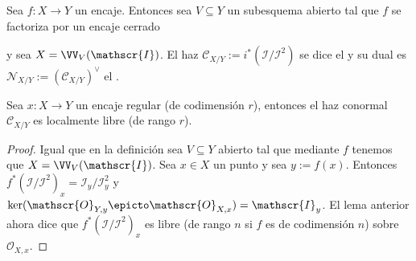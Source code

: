 \begin{mydef}

	Sea $f \colon X \to Y$ un encaje.
	Entonces sea $V \subseteq Y$ un subesquema abierto tal que $f$ se factoriza por un encaje cerrado 
	y sea $X = \VV_V(\mathscr{I})$.
	El haz $\mathscr{C}_{X/Y} := i^*(\mathscr{I/I}^2)$ se dice el  y su dual
	es $\mathscr{N}_{X/Y} := (\mathscr{C}_{X/Y})^\vee$ el .
\end{mydef}
\begin{cor}\label{thm:conormal_rank}
	Sea $x \colon X \to Y$ un encaje regular (de codimensión $r$), entonces el haz conormal $\mathscr{C}_{X/Y}$ es localmente libre (de rango $r$).
\end{cor}
\begin{proof}
	Igual que en la definición sea $V \subseteq Y$ abierto tal que mediante $f$ tenemos que $X = \VV_V(\mathscr{I})$.
	Sea $x \in X$ un punto y sea $y := f(x)$.
	Entonces $f^*( \mathscr{I/I}^2 )_x = \mathscr{I}_y / \mathscr{I}_y^2$ y $\ker( \mathscr{O}_{Y, y} \epicto \mathscr{O}_{X, x} ) = \mathscr{I}_y$.
	El lema anterior ahora dice que $f^*( \mathscr{I/I}^2 )_x$ es libre (de rango $n$ si $f$ es de codimensión $n$) sobre $\mathscr{O}_{X, x}$.
\end{proof}

